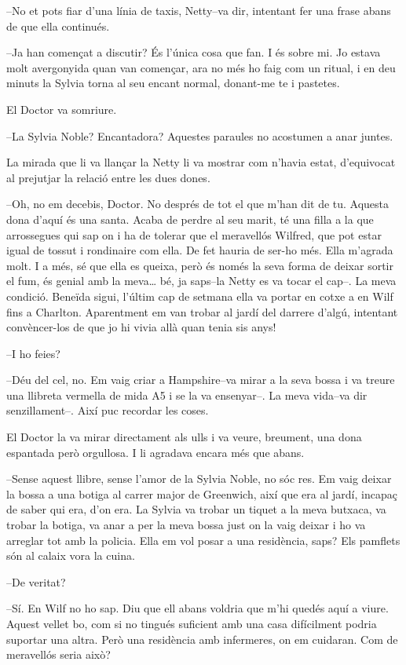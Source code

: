 --No et pots fiar d'una línia de taxis, Netty--va dir, intentant fer una
frase abans de que ella continués.

--Ja han començat a discutir? És l'única cosa que fan. I és sobre mi. Jo
estava molt avergonyida quan van començar, ara no més ho faig com un
ritual, i en deu minuts la Sylvia torna al seu encant normal, donant-me
te i pastetes.

El Doctor va somriure.

--La Sylvia Noble? Encantadora? Aquestes paraules no acostumen a anar
juntes.

La mirada que li va llançar la Netty li va mostrar com n'havia estat,
d'equivocat al prejutjar la relació entre les dues dones.

--Oh, no em decebis, Doctor. No després de tot el que m'han dit de tu.
Aquesta dona d'aquí és una santa. Acaba de perdre al seu marit, té una
filla a la que arrossegues qui sap on i ha de tolerar que el meravellós
Wilfred, que pot estar igual de tossut i rondinaire com ella. De fet
hauria de ser-ho més. Ella m'agrada molt. I a més, sé que ella es
queixa, però és només la seva forma de deixar sortir el fum, és genial
amb la meva\ldots{} bé, ja saps--la Netty es va tocar el cap--. La meva
condició. Beneïda sigui, l'últim cap de setmana ella va portar en cotxe
a en Wilf fins a Charlton. Aparentment em van trobar al jardí del
darrere d'algú, intentant convèncer-los de que jo hi vivia allà quan
tenia sis anys!

--I ho feies?

--Déu del cel, no. Em vaig criar a Hampshire--va mirar a la seva bossa i
va treure una llibreta vermella de mida A5 i se la va ensenyar--. La
meva vida--va dir senzillament--. Així puc recordar les coses.

El Doctor la va mirar directament als ulls i va veure, breument, una
dona espantada però orgullosa. I li agradava encara més que abans.

--Sense aquest llibre, sense l'amor de la Sylvia Noble, no sóc res. Em
vaig deixar la bossa a una botiga al carrer major de Greenwich, així que
era al jardí, incapaç de saber qui era, d'on era. La Sylvia va trobar un
tiquet a la meva butxaca, va trobar la botiga, va anar a per la meva
bossa just on la vaig deixar i ho va arreglar tot amb la policia. Ella
em vol posar a una residència, saps? Els pamflets són al calaix vora la
cuina.

--De veritat?

--Sí. En Wilf no ho sap. Diu que ell abans voldria que m'hi quedés aquí
a viure. Aquest vellet bo, com si no tingués suficient amb una casa
difícilment podria suportar una altra. Però una residència amb
infermeres, on em cuidaran. Com de meravellós seria això?

